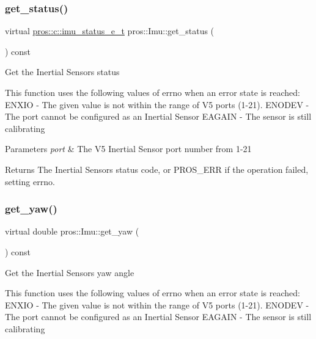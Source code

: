 \subsubsection{\texorpdfstring{get\+\_\+status()}{get\_status()}}
{\footnotesize\ttfamily virtual \hyperlink{imu_8h_a7d3682de24c3a459dddda55d65793309}{pros\+::c\+::imu\+\_\+status\+\_\+e\+\_\+t} pros\+::\+Imu\+::get\+\_\+status (\begin{DoxyParamCaption}{ }\end{DoxyParamCaption}) const\hspace{0.3cm}{\ttfamily [virtual]}}

Get the Inertial Sensor\textquotesingle{}s status

This function uses the following values of errno when an error state is reached\+: E\+N\+X\+IO -\/ The given value is not within the range of V5 ports (1-\/21). E\+N\+O\+D\+EV -\/ The port cannot be configured as an Inertial Sensor E\+A\+G\+A\+IN -\/ The sensor is still calibrating


\begin{DoxyParams}{Parameters}
{\em port} & The V5 Inertial Sensor port number from 1-\/21 \\
\hline
\end{DoxyParams}
\begin{DoxyReturn}{Returns}
The Inertial Sensor\textquotesingle{}s status code, or P\+R\+O\+S\+\_\+\+E\+RR if the operation failed, setting errno. 
\end{DoxyReturn}
\mbox{\label{classpros_1_1Imu_aa2dd2dec5b1a91d4358c23afd8f0f1bd}} 
\subsubsection{\texorpdfstring{get\+\_\+yaw()}{get\_yaw()}}
{\footnotesize\ttfamily virtual double pros\+::\+Imu\+::get\+\_\+yaw (\begin{DoxyParamCaption}{ }\end{DoxyParamCaption}) const\hspace{0.3cm}{\ttfamily [virtual]}}

Get the Inertial Sensor\textquotesingle{}s yaw angle

This function uses the following values of errno when an error state is reached\+: E\+N\+X\+IO -\/ The given value is not within the range of V5 ports (1-\/21). E\+N\+O\+D\+EV -\/ The port cannot be configured as an Inertial Sensor E\+A\+G\+A\+IN -\/ The sensor is still calibrating


